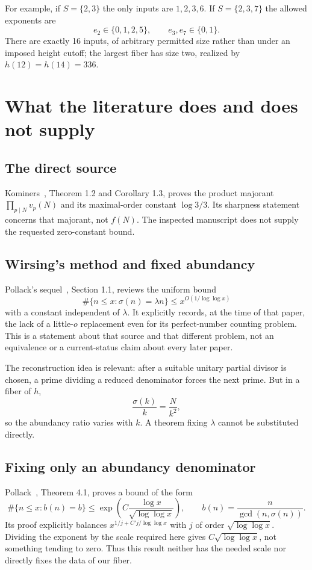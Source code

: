 \documentclass[11pt]{article}
\begin{document}
For example, if $S=\{2,3\}$ the only inputs are $1,2,3,6$. If $S=\{2,3,7\}$ the allowed exponents are
\[
 e_2\in\{0,1,2,5\},\qquad e_3,e_7\in\{0,1\}.
\]
There are exactly 16 inputs, of arbitrary permitted size rather than under an imposed height cutoff; the largest fiber has size two, realized by $h(12)=h(14)=336$.

\section{What the literature does and does not supply}
\subsection*{The direct source}
Kominers~\cite{kominers}, Theorem 1.2 and Corollary 1.3, proves the product majorant $\prod_{p\mid N}v_p(N)$ and its maximal-order constant $\log3/3$. Its sharpness statement concerns that majorant, not $f(N)$. The inspected manuscript does not supply the requested zero-constant bound.

\subsection*{Wirsing's method and fixed abundancy}
Pollack's sequel~\cite{pollack2023}, Section 1.1, reviews the uniform bound
\[
 \#\{n\le x:\sigma(n)=\lambda n\}\le x^{O(1/\log\log x)}
\]
with a constant independent of $\lambda$. It explicitly records, at the time of that paper, the lack of a little-$o$ replacement even for its perfect-number counting problem. This is a statement about that source and that different problem, not an equivalence or a current-status claim about every later paper.

The reconstruction idea is relevant: after a suitable unitary partial divisor is chosen, a prime dividing a reduced denominator forces the next prime. But in a fiber of $h$,
\[
 \frac{\sigma(k)}k=\frac{N}{k^2},
\]
so the abundancy ratio varies with $k$. A theorem fixing $\lambda$ cannot be substituted directly.

\subsection*{Fixing only an abundancy denominator}
Pollack~\cite{pollack2011}, Theorem 4.1, proves a bound of the form
\[
 \#\{n\le x:b(n)=b\}\le
 \exp\!\left(C\frac{\log x}{\sqrt{\log\log x}}\right),
 \qquad b(n)=\frac{n}{\gcd(n,\sigma(n))}.
\]
Its proof explicitly balances $x^{1/j+C'j/\log\log x}$ with $j$ of order $\sqrt{\log\log x}$. Dividing the exponent by the scale required here gives $C\sqrt{\log\log x}$, not something tending to zero. Thus this result neither has the needed scale nor directly fixes the data of our fiber.
\end{document}

